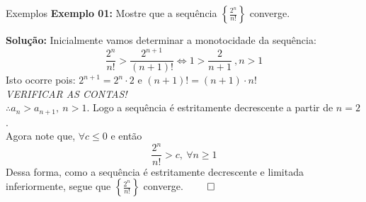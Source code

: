 \documentclass[hyperref={pdfpagelabels=false}]{beamer}
\begin{document}
\begin{frame}{Exemplos}
 {\bf Exemplo 01:} Mostre que a sequência $\left\{\frac{2^n}{n!}\right\}$ converge. \pause
 
 {\bf Solução:} Inicialmente vamos determinar a monotocidade da sequência:
 \begin{equation*}
  \frac{2^n}{n!} > \frac{2^{n+1}}{(n+1)!} \iff 1 > \frac{2}{n+1}~,n > 1
 \end{equation*}
Isto ocorre pois: $2^{n+1} = 2^n \cdot 2$ e $(n+1)! = (n+1)\cdot n!$ \\{\it VERIFICAR AS CONTAS!}
\\$\therefore a_n > a_{n+1},~n>1$. Logo a sequência é estritamente decrescente a partir de $n =2$. \\ \pause
Agora note que, $\forall c \leq 0$ e então $$\frac{2^n}{n!} > c,~\forall n \geq 1$$
Dessa forma, como a sequência é estritamente decrescente e limitada inferiormente, segue que $\left\{\frac{2^n}{n!}\right\}$ converge. $\qed$
\end{frame}
\end{document}
